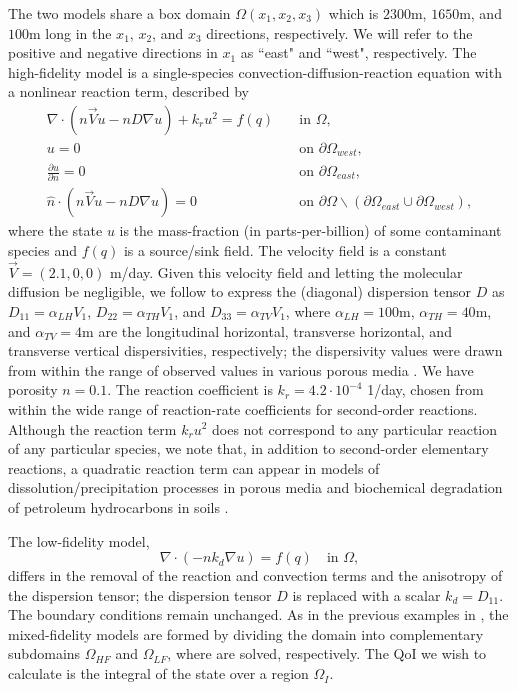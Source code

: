 \documentclass[review,sort&compress]{elsarticle}
\theoremstyle{plain} %
\theoremstyle{definition} %
\begin{document}
The two models share a box domain $\Omega(x_1,x_2,x_3)$ which is $2300$m, $1650$m, and $100$m long in the $x_1$, $x_2$, and $x_3$ directions, respectively. We will refer to the positive and negative directions in $x_1$ as ``east" and ``west", respectively. The high-fidelity model is a single-species convection-diffusion-reaction equation with a nonlinear reaction term, described by
%
\begin{subequations}
\label{eq:cdvcdrHF3D}
\begin{align}
\nabla\cdot(n\vec{V}u - nD\nabla u) + k_ru^2 = f(q) \quad &\text{in } \Omega, \label{eq:HFeq3D}\\
u = 0 \quad &\text{on } \partial \Omega_{west}, \\
\frac{\partial u}{\partial n} = 0 \quad &\text{on }\partial\Omega_{east}, \\
\hat{n}\cdot(n\vec{V}u - nD\nabla u) = 0 \quad &\text{on }\partial\Omega\backslash(\partial\Omega_{east}\cup\partial\Omega_{west}),
\end{align}
\end{subequations}
%
where the state $u$ is the mass-fraction (in parts-per-billion) of some contaminant species and $f(q)$ is a source/sink field. The velocity field is a constant $\vec{V}=(2.1,0,0)$ m/day. Given this velocity field and letting the molecular diffusion be negligible, we follow \cite{Vestedetal93} to express the (diagonal) dispersion tensor $D$ as $D_{11}=\alpha_{LH}V_1$, $D_{22}=\alpha_{TH}V_1$, and $D_{33}=\alpha_{TV}V_1$, where $\alpha_{LH}=100$m, $\alpha_{TH}=40$m, and $\alpha_{TV}=4$m are the longitudinal horizontal, transverse horizontal, and transverse vertical dispersivities, respectively; the dispersivity values were drawn from within the range of observed values in various porous media \cite{Davis86}. We have porosity $n=0.1$. The reaction coefficient is $k_r=4.2\cdot10^{-4}$ 1/day, chosen from within the wide range of reaction-rate coefficients for second-order reactions. Although the reaction term $k_ru^2$ does not correspond to any particular reaction of any particular species, we note that, in addition to second-order elementary reactions, a quadratic reaction term can appear in models of dissolution/precipitation processes in porous media \cite{Aha97} and biochemical degradation of petroleum hydrocarbons in soils \cite{Jack94}.

The low-fidelity model,
%
\begin{equation}
\nabla\cdot(- nk_d\nabla u) = f(q) \quad \text{in } \Omega, \label{eq:LFeq3D}
\end{equation}
%
differs in the removal of the reaction and convection terms and the anisotropy of the dispersion tensor; the dispersion tensor $D$ is replaced with a scalar $k_d=D_{11}$. The boundary conditions remain unchanged. As in the previous examples in , the mixed-fidelity models are formed by dividing the domain into complementary subdomains $\Omega_{HF}$ and $\Omega_{LF}$, where  are solved, respectively. The QoI we wish to calculate is the integral of the state over a region $\Omega_I$.
\end{document}
